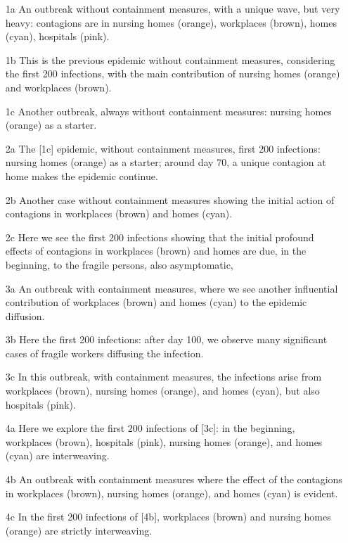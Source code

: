 \documentclass[graybox]{svmult}
\begin{document}
\begin{itemize}
\item [1a] An outbreak without containment measures, with a unique wave, but very heavy: contagions are in nursing homes (orange), workplaces (brown), homes (cyan), hospitals (pink).
\item [1b] This is the previous epidemic without containment measures, considering the first 200 infections, with the main contribution of nursing homes (orange) and workplaces (brown).
\item [1c] Another outbreak, always without containment measures: nursing homes (orange) as a starter.

\item [2a] The [1c] epidemic, without containment measures, first 200 infections: nursing homes (orange) as a starter; around day 70, a unique contagion at home makes the epidemic continue.
\item [2b] Another case without containment measures showing the initial action of contagions in workplaces (brown) and homes (cyan).
\item [2c] Here we see the first 200 infections showing that the initial profound effects of contagions in workplaces (brown) and homes are due, in the beginning, to the fragile persons, also asymptomatic,

\item [3a] An outbreak with containment measures, where we see another influential contribution of workplaces (brown) and homes (cyan) to the epidemic diffusion.
\item [3b] Here the first 200 infections: after day 100, we observe many significant cases of fragile workers diffusing the infection.
\item [3c] In this outbreak, with containment measures, the infections arise from workplaces (brown), nursing homes (orange), and homes (cyan), but also hospitals (pink).

\item [4a] Here we explore the first 200 infections of [3c]: in the beginning, workplaces (brown), hospitals (pink), nursing homes (orange), and homes (cyan) are interweaving.
\item [4b] An outbreak with containment measures where the effect of the contagions in workplaces (brown), nursing homes (orange), and homes (cyan) is evident.
\item [4c] In the first 200 infections of [4b], workplaces (brown) and nursing homes (orange) are strictly interweaving.


\end{itemize}
\end{document}
